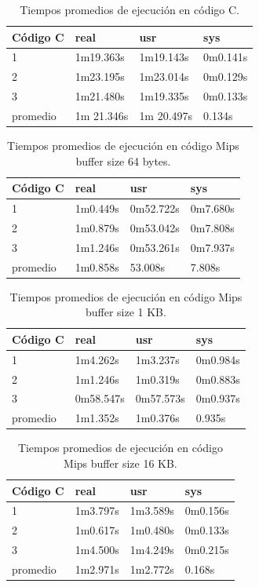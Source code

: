 \documentclass{article}
\begin{document}
\begin{table}[htbp]
\begin{center}
\begin{tabular}{|l|l|l|l|}
\hline
Código C & real & usr & sys \\
\hline \hline
1 & 1m19.363s & 1m19.143s & 0m0.141s \\ \hline
2 & 1m23.195s & 1m23.014s & 0m0.129s \\ \hline
3 & 1m21.480s & 1m19.335s & 0m0.133s \\ \hline
promedio & 1m 21.346s & 1m 20.497s & 0.134s
\end{tabular}
\caption{Tiempos promedios de ejecución en código C.}
\end{center}
\end{table}

\begin{table}[htbp]
\begin{center}
\begin{tabular}{|l|l|l|l|}
\hline
Código C & real & usr & sys \\
\hline \hline
1 & 1m0.449s & 0m52.722s & 0m7.680s \\ \hline
2 & 1m0.879s & 0m53.042s & 0m7.808s \\ \hline
3 & 1m1.246s & 0m53.261s & 0m7.937s \\ \hline
promedio & 1m0.858s & 53.008s & 7.808s
\end{tabular}
\caption{Tiempos promedios de ejecución en código Mips buffer size 64 bytes.}
\end{center}
\end{table}

\begin{table}[htbp]
\begin{center}
\begin{tabular}{|l|l|l|l|}
\hline
Código C & real & usr & sys \\
\hline \hline
1 & 1m4.262s & 1m3.237s & 0m0.984s \\ \hline
2 & 1m1.246s & 1m0.319s & 0m0.883s \\ \hline
3 & 0m58.547s & 0m57.573s & 0m0.937s \\ \hline
promedio & 1m1.352s & 1m0.376s & 0.935s
\end{tabular}
\caption{Tiempos promedios de ejecución en código Mips buffer size 1 KB.}
\end{center}
\end{table}

\begin{table}[htbp]
\begin{center}
\begin{tabular}{|l|l|l|l|}
\hline
Código C & real & usr & sys \\
\hline \hline
1 & 1m3.797s & 1m3.589s & 0m0.156s \\ \hline
2 & 1m0.617s & 1m0.480s & 0m0.133s \\ \hline
3 & 1m4.500s & 1m4.249s & 0m0.215s \\ \hline
promedio & 1m2.971s & 1m2.772s & 0.168s
\end{tabular}
\caption{Tiempos promedios de ejecución en código Mips buffer size 16 KB.}
\end{center}
\end{table}
\end{document}
